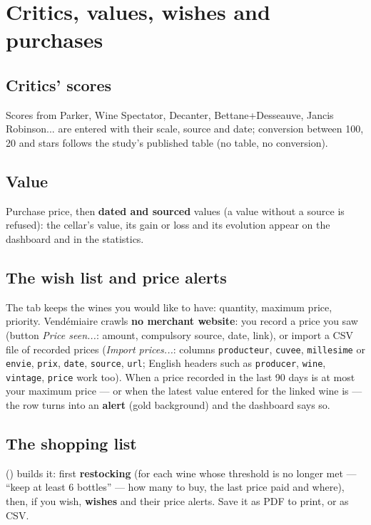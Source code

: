 \documentclass[11pt,a4paper]{article}
\begin{document}

\section{Critics, values, wishes and purchases}
\subsection{Critics' scores}
Scores from Parker, Wine Spectator, Decanter, Bettane+Desseauve, Jancis Robinson... are entered with their
scale, source and date; conversion between 100, 20 and stars follows the study's published table (no table,
no conversion).


\subsection{Value}
Purchase price, then \textbf{dated and sourced} values (a value without a source is refused): the cellar's
value, its gain or loss and its evolution appear on the dashboard and in the statistics.

\subsection{The wish list and price alerts}
The  tab keeps the wines you would like to have: quantity, maximum price, priority.
Vendémiaire crawls \textbf{no merchant website}: you record a price you saw (button \emph{Price seen...}:
amount, compulsory source, date, link), or import a CSV file of recorded prices (\emph{Import prices...}:
columns \texttt{producteur}, \texttt{cuvee}, \texttt{millesime} or \texttt{envie}, \texttt{prix},
\texttt{date}, \texttt{source}, \texttt{url}; English headers such as \texttt{producer}, \texttt{wine},
\texttt{vintage}, \texttt{price} work too). When a price recorded in the last 90 days is at most your maximum
price — or when the latest value entered for the linked wine is — the row turns into an \textbf{alert} (gold
background) and the dashboard says so.


\subsection{The shopping list}
 () builds it: first \textbf{restocking} (for each
wine whose threshold is no longer met — ``keep at least 6 bottles'' — how many to buy, the last price paid and
where), then, if you wish, \textbf{wishes} and their price alerts. Save it as PDF to print, or as CSV.
\end{document}

